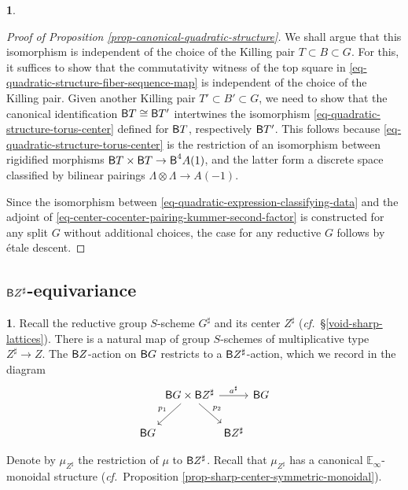 \documentclass[10pt,english,reqno]{amsart}
\newcommand{\deloop}{\textnormal{\textsf{B}}}
\theoremstyle{definition}
\numberwithin{equation}{section}
\newtheorem{untitledsubsubsection}[subsubsection]{}
\newenvironment{void}
{\begin{untitledsubsubsection}}
{\end{untitledsubsubsection}}
\begin{document}
\begin{void}
\begin{proof}[Proof of Proposition \ref{prop-canonical-quadratic-structure}]
We shall argue that this isomorphism is independent of the choice of the Killing pair $T\subset B\subset G$. For this, it suffices to show that the commutativity witness of the top square in \eqref{eq-quadratic-structure-fiber-sequence-map} is independent of the choice of the Killing pair. Given another Killing pair $T' \subset B' \subset G$, we need to show that the canonical identification $\deloop T \cong \deloop T'$ intertwines the isomorphism \eqref{eq-quadratic-structure-torus-center} defined for $\deloop T$, respectively $\deloop T'$. This follows because \eqref{eq-quadratic-structure-torus-center} is the restriction of an isomorphism between rigidified morphisms $\deloop T\times \deloop T \rightarrow \deloop^4A(1)$, and the latter form a discrete space classified by bilinear pairings $\Lambda \otimes \Lambda \rightarrow A(-1)$.

Since the isomorphism between \eqref{eq-quadratic-expression-classifying-data} and the adjoint of \eqref{eq-center-cocenter-pairing-kummer-second-factor} is constructed for any split $G$ without additional choices, the case for any reductive $G$ follows by \'etale descent.
\end{proof}
\end{void}



\subsection{$\deloop Z^{\sharp}$-equivariance}

\begin{void}
Recall the reductive group $S$-scheme $G^{\sharp}$ and its center $Z^{\sharp}$ (\emph{cf.}~\S\ref{void-sharp-lattices}). There is a natural map of group $S$-schemes of multiplicative type $Z^{\sharp} \rightarrow Z$. The $\deloop Z$-action on $\deloop G$ restricts to a $\deloop Z^{\sharp}$-action, which we record in the diagram
\begin{equation}
\label{eq-sharp-center-action-diagram}
\begin{tikzcd}[column sep = 0em]
& \deloop G \times \deloop Z^{\sharp} \ar[rr, "a^{\sharp}"]\ar[dl, swap, "p_1"]\ar[dr, "p_2"] & & \deloop G \\
\deloop G & & \deloop Z^{\sharp}
\end{tikzcd}
\end{equation}

Denote by $\mu_{Z^{\sharp}}$ the restriction of $\mu$ to $\deloop Z^{\sharp}$. Recall that $\mu_{Z^{\sharp}}$ has a canonical $\mathbb E_{\infty}$-monoidal structure (\emph{cf.}~Proposition \ref{prop-sharp-center-symmetric-monoidal}).
\end{void}
\end{document}
